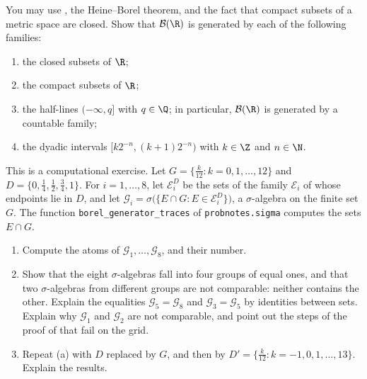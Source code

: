 \begin{exercise}\label{ex:sa-borel-more}
\medium You may use , the Heine--Borel theorem, and the fact
that compact subsets of a metric space are closed. Show that
$\mathcal B(\R)$ is generated by each of the following families:
\begin{enumerate}[label=(\alph*)]
  \item the closed subsets of $\R$;
  \item the compact subsets of $\R$;
  \item the half-lines $(-\infty,q]$ with $q\in\Q$; in particular, $\mathcal B(\R)$ is generated by
    a countable family;
  \item the dyadic intervals $[k2^{-n},(k+1)2^{-n})$ with $k\in\Z$ and $n\in\N$.
\end{enumerate}
\end{exercise}

\begin{exercise}\label{ex:sa-grid}
\medium This is a computational exercise. Let $G=\{\frac k{12}:k=0,1,\dots,12\}$ and
$D=\{0,\frac14,\frac12,\frac34,1\}$. For $i=1,\dots,8$, let $\mathcal E_i^D$ be the sets of the
family $\mathcal E_i$ of  whose endpoints lie in $D$, and let
$\mathcal G_i=\sigma\big(\{E\cap G:E\in\mathcal E_i^D\}\big)$, a $\sigma$-algebra on the finite set
$G$. The function \texttt{borel\_generator\_traces} of \texttt{probnotes.sigma} computes the sets
$E\cap G$.
\begin{enumerate}[label=(\alph*)]
  \item Compute the atoms of $\mathcal G_1,\dots,\mathcal G_8$, and their number.
  \item Show that the eight $\sigma$-algebras fall into four groups of equal ones, and that two
    $\sigma$-algebras from different groups are not comparable: neither contains the other.
    Explain the equalities $\mathcal G_5=\mathcal G_8$ and $\mathcal G_3=\mathcal G_5$ by
    identities between sets. Explain why $\mathcal G_1$ and $\mathcal G_2$ are not comparable, and
    point out the steps of the proof of  that fail on the grid.
  \item Repeat (a) with $D$ replaced by $G$, and then by
    $D'=\{\frac k{12}:k=-1,0,1,\dots,13\}$. Explain the results.
\end{enumerate}
\end{exercise}


